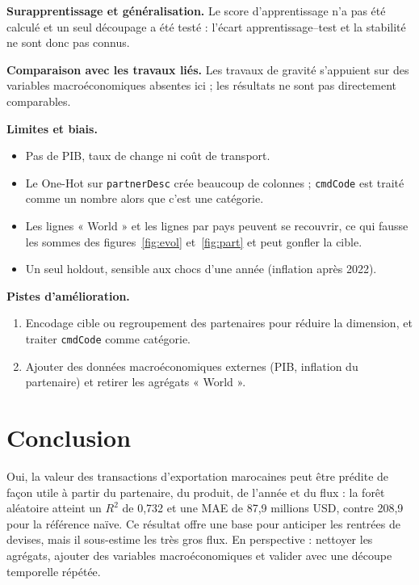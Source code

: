 \documentclass[11pt,a4paper]{article}
\begin{document}
\textbf{Surapprentissage et généralisation.} Le score d'apprentissage n'a pas été calculé et un seul découpage a été testé : l'écart apprentissage--test et la stabilité ne sont donc pas connus.

\textbf{Comparaison avec les travaux liés.} Les travaux de gravité \cite{anderson,yotov} s'appuient sur des variables macroéconomiques absentes ici ; les résultats ne sont pas directement comparables.

\textbf{Limites et biais.}
\begin{itemize}[leftmargin=1.2em]
\item Pas de PIB, taux de change ni coût de transport.
\item Le One-Hot sur \texttt{partnerDesc} crée beaucoup de colonnes ; \texttt{cmdCode} est traité comme un nombre alors que c'est une catégorie.
\item Les lignes « World » et les lignes par pays peuvent se recouvrir, ce qui fausse les sommes des figures~\ref{fig:evol} et~\ref{fig:part} et peut gonfler la cible.
\item Un seul holdout, sensible aux chocs d'une année (inflation après 2022).
\end{itemize}

\textbf{Pistes d'amélioration.}
\begin{enumerate}[leftmargin=1.5em]
\item Encodage cible ou regroupement des partenaires pour réduire la dimension, et traiter \texttt{cmdCode} comme catégorie.
\item Ajouter des données macroéconomiques externes (PIB, inflation du partenaire) et retirer les agrégats « World ».
\end{enumerate}

\section{Conclusion}\label{sec:concl}
Oui, la valeur des transactions d'exportation marocaines peut être prédite de façon utile à partir du partenaire, du produit, de l'année et du flux : la forêt aléatoire atteint un $R^2$ de 0,732 et une MAE de 87,9 millions USD, contre 208,9 pour la référence naïve. Ce résultat offre une base pour anticiper les rentrées de devises, mais il sous-estime les très gros flux. En perspective : nettoyer les agrégats, ajouter des variables macroéconomiques et valider avec une découpe temporelle répétée.
\end{document}

